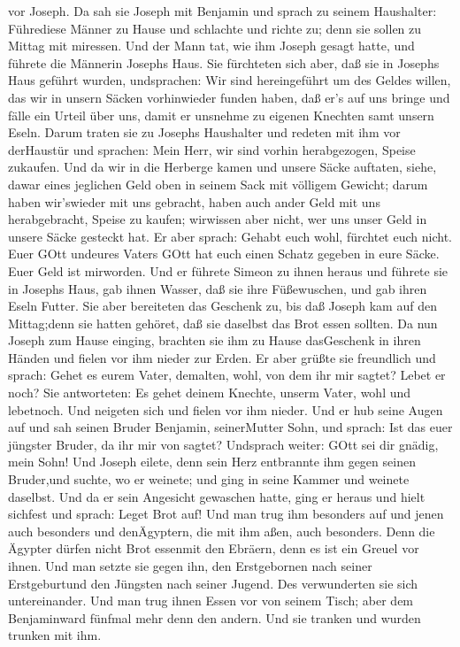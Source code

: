 vor Joseph.  Da sah sie Joseph mit Benjamin und sprach zu
seinem Haushalter: Führediese Männer zu Hause und schlachte und richte
zu; denn sie sollen zu Mittag mit miressen.  Und der Mann
tat, wie ihm Joseph gesagt hatte, und führete die Männerin Josephs Haus.
 Sie fürchteten sich aber, daß sie in Josephs Haus geführt
wurden, undsprachen: Wir sind hereingeführt um des Geldes willen, das
wir in unsern Säcken vorhinwieder funden haben, daß er's auf uns bringe
und fälle ein Urteil über uns, damit er unsnehme zu eigenen Knechten
samt unsern Eseln.  Darum traten sie zu Josephs Haushalter
und redeten mit ihm vor derHaustür  und sprachen: Mein
Herr, wir sind vorhin herabgezogen, Speise zukaufen.  Und
da wir in die Herberge kamen und unsere Säcke auftaten, siehe, dawar
eines jeglichen Geld oben in seinem Sack mit völligem Gewicht; darum
haben wir'swieder mit uns gebracht,  haben auch ander Geld
mit uns herabgebracht, Speise zu kaufen; wirwissen aber nicht, wer uns
unser Geld in unsere Säcke gesteckt hat.  Er aber sprach:
Gehabt euch wohl, fürchtet euch nicht. Euer GOtt undeures Vaters GOtt
hat euch einen Schatz gegeben in eure Säcke. Euer Geld ist mirworden.
Und er führete Simeon zu ihnen heraus  und führete sie in
Josephs Haus, gab ihnen Wasser, daß sie ihre Füßewuschen, und gab ihren
Eseln Futter.  Sie aber bereiteten das Geschenk zu, bis daß
Joseph kam auf den Mittag;denn sie hatten gehöret, daß sie daselbst das
Brot essen sollten.  Da nun Joseph zum Hause einging,
brachten sie ihm zu Hause dasGeschenk in ihren Händen und fielen vor ihm
nieder zur Erden.  Er aber grüßte sie freundlich und
sprach: Gehet es eurem Vater, demalten, wohl, von dem ihr mir sagtet?
Lebet er noch?  Sie antworteten: Es gehet deinem Knechte,
unserm Vater, wohl und lebetnoch. Und neigeten sich und fielen vor ihm
nieder.  Und er hub seine Augen auf und sah seinen Bruder
Benjamin, seinerMutter Sohn, und sprach: Ist das euer jüngster Bruder,
da ihr mir von sagtet? Undsprach weiter: GOtt sei dir gnädig, mein Sohn!
 Und Joseph eilete, denn sein Herz entbrannte ihm gegen
seinen Bruder,und suchte, wo er weinete; und ging in seine Kammer und
weinete daselbst.  Und da er sein Angesicht gewaschen
hatte, ging er heraus und hielt sichfest und sprach: Leget Brot auf!
 Und man trug ihm besonders auf und jenen auch besonders
und denÄgyptern, die mit ihm aßen, auch besonders. Denn die Ägypter
dürfen nicht Brot essenmit den Ebräern, denn es ist ein Greuel vor
ihnen.  Und man setzte sie gegen ihn, den Erstgebornen nach
seiner Erstgeburtund den Jüngsten nach seiner Jugend. Des verwunderten
sie sich untereinander.  Und man trug ihnen Essen vor von
seinem Tisch; aber dem Benjaminward fünfmal mehr denn den andern. Und
sie tranken und wurden trunken mit ihm.

